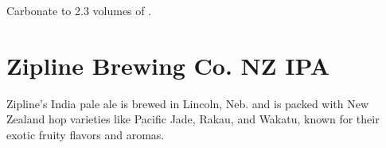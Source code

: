 \documentclass[10pt,oneside]{scrbook}
\begin{document}

\begin{methodandtiming}
 
\begin{mashsteps}
\end{mashsteps}

\begin{fermentationsteps}
\end{fermentationsteps}

\begin{directions}
Carbonate to 2.3 volumes of .
\end{directions}

\end{methodandtiming}

\pagebreak

\begin{ingredientsblock}

\begin{malts}
\end{malts}

\begin{hops}
\end{hops}

\begin{yeasts}
\end{yeasts}

\end{ingredientsblock}

\chapter*{Zipline Brewing Co. NZ IPA}

\begin{aboutblock}
Zipline's India pale ale is brewed in Lincoln, Neb. and is packed with New Zealand hop
varieties like Pacific Jade, Rakau, and Wakatu, known for their exotic fruity flavors and
aromas.
\end{aboutblock}
\end{document}
